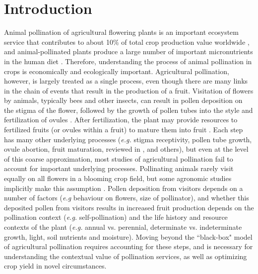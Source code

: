 \documentclass[12pt, draft]{article} %
\begin{document}
\section{Introduction}
Animal pollination of agricultural flowering plants is an important ecosystem service that contributes to about 10\% of total crop production value worldwide \citep{gallai2009}, and animal-pollinated plants produce a large number of important micronutrients in the human diet \citep{eilers2011}.
Therefore, understanding the process of animal pollination in crops is economically and ecologically important. %
Agricultural pollination, however, is largely treated as a single process, even though there are many links in the chain of events that result in the production of a fruit.
Visitation of flowers by animals, typically bees and other insects, can result in pollen deposition on the stigma of the flower, followed by the growth of pollen tubes into the style and fertilization of ovules \citep{erbar2003}. 
After fertilization, the plant may provide resources to fertilized fruits (or ovules within a fruit) to mature them into fruit \citep{goldberg1994}.
Each step has many other underlying processes (\textit{e.g.} stigma receptivity, pollen tube growth, ovule abortion, fruit maturation, reviewed in \citealp{real1983, giovannoni2001, erbar2003, takayama2005}, and others), but even at the level of this coarse approximation, most studies of agricultural pollination fail to account for important underlying processes.
Pollinating animals rarely visit equally on all flowers in a blooming crop field\citep{currie1997, brosi2008, isaacs2010}, but some agronomic studies implicitly make this assumption \citep{phillips1989, bommarco2012, bartomeus2014}. 
Pollen deposition from visitors depends on a number of factors (\textit{e.g} behaviour on flowers, size of pollinator), and whether this deposited pollen from visitors results in increased fruit production depends on the pollination context (\textit{e.g.} self-pollination) and the life history and resource contexts of the plant (\textit{e.g.} annual vs. perennial, determinate vs. indeterminate growth, light, soil nutrients and moisture).
Moving beyond the ``black-box" model of agricultural pollination requires accounting for these steps, and is necessary for understanding the contextual value of pollination services, as well as optimizing crop yield in novel circumstances.
\end{document}
